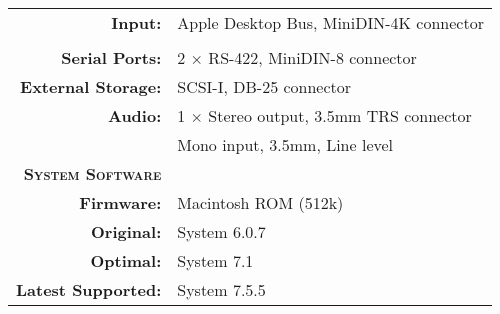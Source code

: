 \begin{tabular}{ r p{6in} }
\\
\textbf{Input:} & Apple Desktop Bus, MiniDIN-4K connector \\
\\
\textbf{Serial Ports:} & 2 \(\times\) RS-422, MiniDIN-8 connector \\
\textbf{External Storage:} & SCSI-I, DB-25 connector \\
\textbf{Audio:} & 1 \(\times\) Stereo output, 3.5mm TRS connector \\
~ & Mono input, 3.5mm, Line level
\\
\textbf{\textsc{System Software}} & ~ \\
\textbf{Firmware:} & Macintosh ROM (512k) \\
\textbf{Original:} & System 6.0.7 \\
\textbf{Optimal:} & System 7.1 \\
\textbf{Latest Supported:} & System 7.5.5 \\
\end{tabular}

